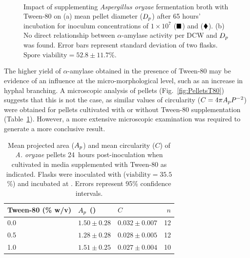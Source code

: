 \begin{figure}[htbp]
	\centering
	\captionsetup[subfloat]{position=top}
	\\
  \caption{Impact of supplementing \emph{Aspergillus oryzae} fermentation broth with Tween-80 on (a) mean pellet diameter ($D_p$) after 65 hours' incubation for inoculum concentrations of $1 \times 10^7$ ($\blacksquare$) and  ($\blacklozenge$). (b) No direct relationship between $\alpha$-amylase activity per DCW and $D_p$ was found. Error bars represent standard deviation of two flasks. $\mbox{Spore viability} = 52.8 \pm 11.7$\%.}
\end{figure}

The higher yield of $\alpha$-amylase obtained in the presence of Tween-80 may be evidence of an influence at the micro-morphological level, such as an increase in hyphal branching. A microscopic analysis of pellets (Fig.~\ref{fig:PelletsT80}) suggests that this is not the case, as similar values of circularity ($C = 4 \pi A_p P^{-2}$) were obtained for pellets cultivated with or without Tween-80 supplementation (Table~\ref{tab:TweenPelletMorph}). However, a more extensive microscopic examination was required to generate a more conclusive result.

\begin{table}[tb]
	\centering
	\footnotesize
	\caption{Mean projected area ($A_p$) and mean circularity ($C$) of \emph{A. oryzae} pellets 24~hours post-inoculation when cultivated in media supplemented with Tween-80 as indicated. Flasks were inoculated with  ($\mbox{viability} = 35.5$\%) and incubated at . Errors represent 95\% confidence intervals.}
	\label{tab:TweenPelletMorph}
	\begin{tabularx}{(\textwidth - 1cm)}{X X X r}
		\toprule
		Tween-80 (\% w/v) & $A_p$ (\mics{$\times 10^6$}) & $C$ & $n$ \\
		\midrule
		0.0 & $1.50 \pm 0.28$ & $0.032 \pm 0.007$ & 12\\
		0.5 & $1.28 \pm 0.28$ & $0.028 \pm 0.005$ & 12\\
		1.0 & $1.51 \pm 0.25$ & $0.027 \pm 0.004$ & 10\\
		\bottomrule
	\end{tabularx}
\end{table}

